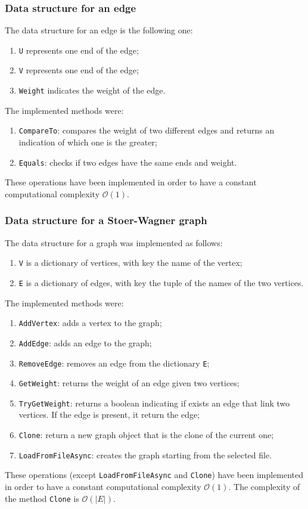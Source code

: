 \subsubsection{Data structure for an edge}
The data structure for an edge is the following one:
\begin{enumerate}
    \item \verb|U| represents one end of the edge;
    \item \verb|V| represents one end of the edge;
    \item \verb|Weight| indicates the weight of the edge.
    \end{enumerate}
\noindent
The implemented methods were:
\begin{enumerate}
    \item \verb|CompareTo|: compares the weight of two different edges and returns an indication of which one is the greater;
    \item \verb|Equals|: checks if two edges have the same ends and weight.
\end{enumerate}
These operations have been implemented in order to have a constant computational complexity $\mathcal{O}(1)$.

\subsubsection{Data structure for a Stoer-Wagner graph}
The data structure for a graph was implemented as follows:
\begin{enumerate}
    \item \verb|V| is a dictionary of vertices, with key the name of the vertex;
    \item \verb|E| is a dictionary of edges, with key the tuple of the names of the two vertices.
\end{enumerate}
\noindent
The implemented methods were:
\begin{enumerate}
    \item \verb|AddVertex|: adds a vertex to the graph;
    \item \verb|AddEdge|: adds an edge to the graph;
    \item \verb|RemoveEdge|: removes an edge from the dictionary \verb|E|;
    \item \verb|GetWeight|: returns the weight of an edge given two vertices;
    \item \verb|TryGetWeight|: returns a boolean indicating if exists an edge that link two vertices. If the edge is present, it return the edge;
    \item \verb|Clone|: return a new graph object that is the clone of the current one;
    \item \verb|LoadFromFileAsync|: creates the graph starting from the selected file.
\end{enumerate}
These operations (except \verb|LoadFromFileAsync| and \verb|Clone|) have been implemented in order to have a constant computational complexity $\mathcal{O}(1)$.
The complexity of the method \verb|Clone| is $\mathcal{O}(|E|)$.

